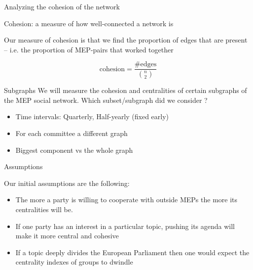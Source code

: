\documentclass{beamer}
\begin{document}
\begin{frame}{Analyzing the cohesion of the network}
	
	Cohesion: a measure of how well-connected a network is
	
	\vspace{2mm}
	
	\pause Our measure of cohesion is that we find the proportion of edges that are present -- i.e. the proportion of MEP-pairs that worked together
	
	\pause \[
		\text{cohesion} = \frac{\#\text{edges}}{\binom{n}{2}}
	\]
	
\end{frame}


\begin{frame}{Subgraphs}
	We will measure the cohesion and centralities of certain subgraphs of the MEP social network.
	Which subset/subgraph did we consider ? 
	\begin{itemize}
	\pause \item Time intervals: Quarterly, Half-yearly (fixed early)
	\pause \item For each committee a different graph
	\pause \item Biggest component vs the whole graph
	\end{itemize}
\end{frame}


\begin{frame}{Assumptions}

Our initial assumptions are the following:
\bigskip
\begin{itemize}
	\pause \item The more a party is willing to cooperate with outside MEPs the more its centralities will be.

	\pause \item If one party has an interest in a particular topic, pushing its agenda will make it more central and cohesive
	
	\pause \item If a topic deeply divides the European Parliament then one would expect the centrality indexes of groups to dwindle 
\end{itemize}
\end{frame}
\end{document}
